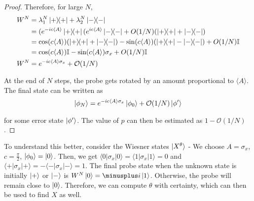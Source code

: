\documentclass[]{article}
\newcommand{\cO}{\mathcal O}
\newcommand*{\mp}{\minusplus}
\newcommand*{\E}[1]{\langle #1 \rangle}
\newcommand{\Exp}[3]{\langle #1 \vert #2 \vert #3 \rangle}
\begin{document}
\begin{proof}
    Therefore, for large $N$, 
    \begin{align*}
        W^N &= \lambda^N_1 \ketbra{+}{+} + \lambda^N_2 \ketbra{-}{-} \\
        &= (e^{-ic\E{A}} \ketbra{+} (e^{ic\E{A}} \ketbra{-} + O(1/N) (\ketbra{+} + \ketbra{-}) \\
        &= \cos (c\E{A}) (\ketbra{+} + \ketbra{-}) - \sin (c \E{A}) (\ketbra{+} - \ketbra{-}) + O(1/N) \mathbb I \\
        &= \cos (c\E{A})\mathbb I - \sin (c \E{A}) \sigma_x + O(1/N) \mathbb I \\
        W^N &= e^{-ic \E{A} \sigma_x} + \cO(1/N)
    \end{align*}

    At the end of $N$ steps, the probe gets rotated by an amount proportional to $\E{A}$. The final state can be written as 
    \begin{align}
        \ket{\phi_N} = e^{-ic \E{A} \sigma_x} \ket{\phi_0} + \cO(1/N) \ket{\phi'}
    \end{align}

    for some error state $\ket{\phi'}$. The value of $p$ can then be estimated as $1 - \cO(1/N)$.
\end{proof}

To understand this better, consider the Wiesner states $\ket{X^\theta}$ - We choose $A = \sigma_x$, $c = \frac{\pi}{2}$, $\ket{\phi_0} = \ket{0}$. Then, we get $\Exp{0}{\sigma_x}{0} = \Exp{1}{\sigma_x}{1} = 0$ and $\Exp{+}{\sigma_x}{+} = - \Exp{-}{\sigma_x}{-} = 1$. The final probe state when the unknown state is initially $\ket{+}$ or $\ket{-}$ is $W^N \ket{0} = \mp i \ket{1}$. Otherwise, the probe will remain close to $\ket{0}$. Therefore, we can compute $\theta$ with certainty, which can then be used to find $X$ as well.
\end{document}
